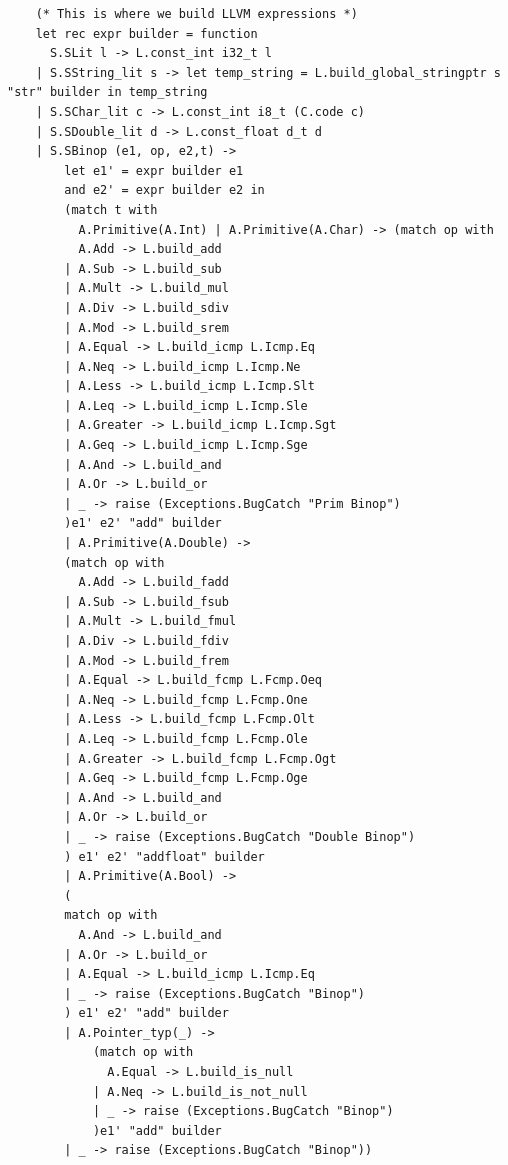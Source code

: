 \documentclass{article}
\begin{document}
\begin{lstlisting}
	(* This is where we build LLVM expressions *)
	let rec expr builder = function 
	  S.SLit l -> L.const_int i32_t l
	| S.SString_lit s -> let temp_string = L.build_global_stringptr s "str" builder in temp_string 
	| S.SChar_lit c -> L.const_int i8_t (C.code c)
	| S.SDouble_lit d -> L.const_float d_t d
	| S.SBinop (e1, op, e2,t) -> 
		let e1' = expr builder e1 
		and e2' = expr builder e2 in
		(match t with 
		  A.Primitive(A.Int) | A.Primitive(A.Char) -> (match op with 
		  A.Add -> L.build_add 
		| A.Sub -> L.build_sub
		| A.Mult -> L.build_mul
		| A.Div -> L.build_sdiv
		| A.Mod -> L.build_srem
		| A.Equal -> L.build_icmp L.Icmp.Eq
		| A.Neq -> L.build_icmp L.Icmp.Ne
		| A.Less -> L.build_icmp L.Icmp.Slt
		| A.Leq -> L.build_icmp L.Icmp.Sle
		| A.Greater -> L.build_icmp L.Icmp.Sgt
		| A.Geq -> L.build_icmp L.Icmp.Sge
		| A.And -> L.build_and
		| A.Or -> L.build_or
		| _ -> raise (Exceptions.BugCatch "Prim Binop")		
		)e1' e2' "add" builder
		| A.Primitive(A.Double) ->
		(match op with 
		  A.Add -> L.build_fadd 
		| A.Sub -> L.build_fsub
		| A.Mult -> L.build_fmul
		| A.Div -> L.build_fdiv
		| A.Mod -> L.build_frem
		| A.Equal -> L.build_fcmp L.Fcmp.Oeq
		| A.Neq -> L.build_fcmp L.Fcmp.One
		| A.Less -> L.build_fcmp L.Fcmp.Olt
		| A.Leq -> L.build_fcmp L.Fcmp.Ole
		| A.Greater -> L.build_fcmp L.Fcmp.Ogt
		| A.Geq -> L.build_fcmp L.Fcmp.Oge
		| A.And -> L.build_and
		| A.Or -> L.build_or
		| _ -> raise (Exceptions.BugCatch "Double Binop")
		) e1' e2' "addfloat" builder
		| A.Primitive(A.Bool) -> 
		(
		match op with 
		  A.And -> L.build_and
		| A.Or -> L.build_or
		| A.Equal -> L.build_icmp L.Icmp.Eq
		| _ -> raise (Exceptions.BugCatch "Binop")
		) e1' e2' "add" builder	
		| A.Pointer_typ(_) ->
			(match op with
			  A.Equal -> L.build_is_null
			| A.Neq -> L.build_is_not_null
			| _ -> raise (Exceptions.BugCatch "Binop")
			)e1' "add" builder
		| _ -> raise (Exceptions.BugCatch "Binop")) 		 


\end{lstlisting}
\end{document}
